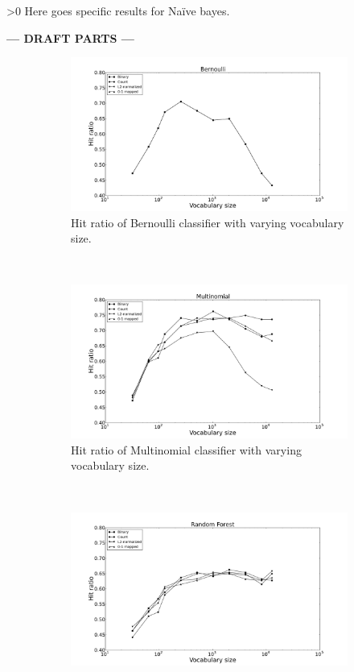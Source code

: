 \ifnum\printdraft>0
	Here goes specific results for Naïve bayes.
\else
\begin{center}
  	\textbf{--- DRAFT PARTS ---}
\end{center}
\fi
\newcommand{\figwidth}{0.45\textwidth}
\begin{figure}[H]
	\centering
	\begin{subfigure}[b]{\figwidth}
		\includegraphics[width=\textwidth]{img/Bernoulli-hitrate-eps-converted-to.pdf}
		\caption{Hit ratio of Bernoulli classifier with varying vocabulary size.}
		\label{fig:hitrate-nb}
	\end{subfigure}
	~
	\begin{subfigure}[b]{\figwidth}
		\includegraphics[width=\textwidth]{img/Multinomial-hitrate-eps-converted-to.pdf}
		\caption{Hit ratio of Multinomial classifier with varying vocabulary size.}
		\label{fig:hitrate-mn}
	\end{subfigure}
	\\
	\begin{subfigure}[b]{\figwidth}
		\includegraphics[width=\textwidth]{img/Random-Forest-hitrate-eps-converted-to.pdf}

\end{subfigure}
\end{figure}
